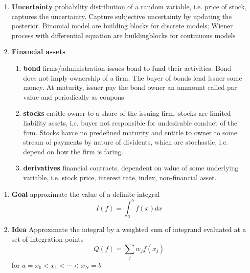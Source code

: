 \documentclass[11pt]{article}
\begin{document}
\begin{enumerate}
    \item \textbf{Uncertainty} probability distribution of a random variable, i.e. price of stock, captures the uncertainty. Capture subjective uncertainty by updating the posterior. Binomial model are building blocks for discrete models; Wiener process with differential equation are buildingblocks for continuous models
    \item \textbf{Financial assets}
    \begin{enumerate}
        \item \textbf{bond} firms/administration issues bond to fund their activities. Bond does not imply ownership of a firm. The buyer of bonds lend issuer some money. At maturity, issuer pay the bond owner an ammount called par value and periodically as coupons
        \item \textbf{stocks} entitle owner to a share of the issuing firm. stocks are limited liability assets, i.e. buyer not responsible for undesirable conduct of the firm. Stocks havce no predefined maturity and entitle to owner to some stream of payments by nature of dividents, which are stochastic, i.e. depend on how the firm is faring. 
        \item \textbf{derivatives} financial contracts, dependent on value of some underlying variable, i.e. stock price, interest rate, index, non-financial asset.
    \end{enumerate}
\end{enumerate}
 




\begin{enumerate}
    \item \textbf{Goal} approximate the value of a definite integral 
    \[
        I(f) = \int_{a}^b f(x) dx    
    \]
    \item \textbf{Idea} Approximate the integral by a weighted sum of integrand evaluated at a set of integration points 
    \[
        Q(f) = \sum_j w_j f(x_j)  
    \]
    for $a = x_0 < x_1 < \cdots < x_N = b$ 
\end{enumerate}



\end{document}

